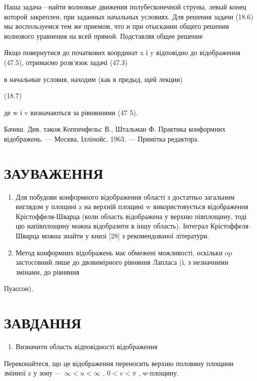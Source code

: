 \documentclass[
  ukrainian,
]{article}
\providecommand{\tightlist}{%
  \setlength{\itemsep}{0pt}\setlength{\parskip}{0pt}}
\begin{document}
Наша задача---найти волновые движения полубесконечной струны, левый
конец которой закреплен, при заданных начальных условиях. Для решения
задачи (18.6) мы воспользуемся тем же приемом, что и при отыскании
общего решения волнового уравнения на всей прямой. Подставляя общее
решение

Якщо повернутися до початкових координат x і y відповідно до
відображення (47.5), отримаємо розв'язок задачі (47.3)

в начальные условия, находим (как в предыд, щей лекции)

(18.7)

де w і v визначаються за рівняннями (47 5).

Бачиш. Див. також Коппенфельс В., Штальман Ф. Практика конформних
відображень. --- Москва, Іллінойс, 1963. --- Примітка редактора.

\section{ЗАУВАЖЕННЯ}\label{ux437ux430ux443ux432ux430ux436ux435ux43dux43dux44f-7}

\begin{enumerate}
\def\labelenumi{\arabic{enumi}.}
\item
  Для побудови конформного відображення області з достатньо загальним
  виглядом у площині z на верхній площині w використовується
  відображення Крістоффеля-Шварца (коли область відображена у верхню
  півплощину, тоді цю напівплощину можна відобразити в іншу область).
  Інтеграл Крістоффеля--Шварца можна знайти у книзі {[}28{]} з
  рекомендованої літератури.
\item
  Метод конформних відображень має обмежені можливості, оскільки op
  застосовний лише до двовимірного рівняння Лапласа (і, з незначними
  змінами, до рівняння
\end{enumerate}

Пуассон).

\section{ЗАВДАННЯ}\label{ux437ux430ux432ux434ux430ux43dux43dux44f-10}

\begin{enumerate}
\def\labelenumi{\arabic{enumi}.}
\tightlist
\item
  Визначити область відповідності відображення
\end{enumerate}

Переконайтеся, що це відображення переносить верхню половину площини
змінної z у зону --- \(\infty < u < \infty\) , \(0 < v < \pi\) ,
w-площину.
\end{document}
